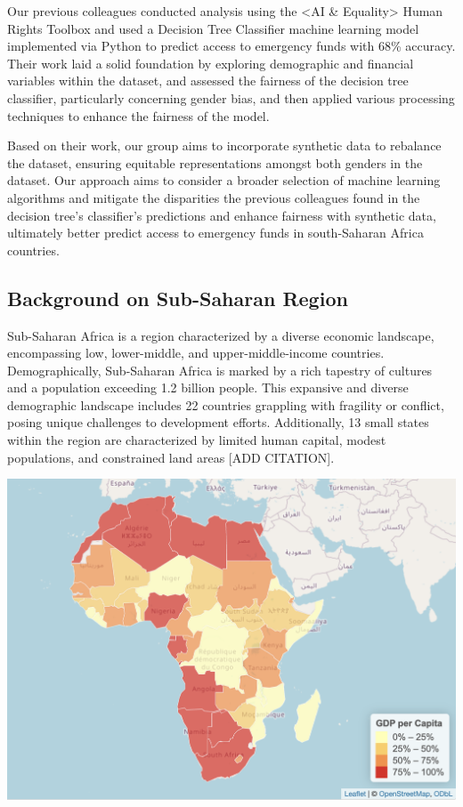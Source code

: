 \documentclass[12pt]{article}
\begin{document}
Our previous colleagues conducted analysis using the \textless AI \&
Equality\textgreater{} Human Rights Toolbox and used a Decision Tree
Classifier machine learning model implemented via Python to predict
access to emergency funds with 68\% accuracy. Their work laid a solid
foundation by exploring demographic and financial variables within the
dataset, and assessed the fairness of the decision tree classifier,
particularly concerning gender bias, and then applied various processing
techniques to enhance the fairness of the model\citep{Porta2022}.

Based on their work, our group aims to incorporate synthetic data to
rebalance the dataset, ensuring equitable representations amongst both
genders in the dataset. Our approach aims to consider a broader
selection of machine learning algorithms and mitigate the disparities
the previous colleagues found in the decision tree's classifier's
predictions and enhance fairness with synthetic data, ultimately better
predict access to emergency funds in south-Saharan Africa
countries\citep{SyntheticDataAIEquality}.

\hypertarget{background-on-sub-saharan-region}{%
\subsection{Background on Sub-Saharan
Region}\label{background-on-sub-saharan-region}}

Sub-Saharan Africa is a region characterized by a diverse economic
landscape, encompassing low, lower-middle, and upper-middle-income
countries. Demographically, Sub-Saharan Africa is marked by a rich
tapestry of cultures and a population exceeding 1.2 billion people. This
expansive and diverse demographic landscape includes 22 countries
grappling with fragility or conflict, posing unique challenges to
development efforts. Additionally, 13 small states within the region are
characterized by limited human capital, modest populations, and
constrained land areas {[}ADD CITATION{]}.

\begin{center}\includegraphics[width=0.7\linewidth]{graphs/map} \end{center}
\end{document}

